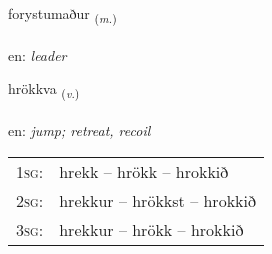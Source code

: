 \documentclass[frontgrid, backgrid]{flacards}\usepackage[]{graphicx}\usepackage[]{xcolor}
\begin{document}
\renewcommand{\flhead}{\vskip5pt \fboxsep=0pt {\small\bfseries\footnotesize Nafnorð | Noun}}
\renewcommand{\fcfoot}{\vskip5pt \fboxsep=0pt \hspace{2pt}{\small\bfseries\footnotesize 3K}}

\renewcommand{\blhead}{\vskip5pt {\small\bfseries\footnotesize Nafnorð | Noun }}
\renewcommand{\bcfoot}{\vskip5pt \hspace{2pt}{\small\bfseries\footnotesize 3K}}


{forystumaður \small{\textsubscript{(\textit{m.})}} \\[1ex] %
\textphonetic{[fɔːrɪstʏmaðʏr]} \\
en: \emph{leader} \\  [2ex]
\renewcommand*{\arraystretch}{0.8}
}

\renewcommand{\flhead}{\vskip5pt \fboxsep=0pt {\small\bfseries\footnotesize Sagnorð | Verb}}
\renewcommand{\fcfoot}{\vskip5pt \fboxsep=0pt \hspace{2pt}{\small\bfseries\footnotesize 3K}}

\renewcommand{\blhead}{\vskip5pt {\small\bfseries\footnotesize Sagnorð | Verb }}
\renewcommand{\bcfoot}{\vskip5pt \hspace{2pt}{\small\bfseries\footnotesize 3K}}


{hrökkva \small{\textsubscript{(\textit{v.})}} \\[1ex] %
\textphonetic{[r̥œhkva]} \\
en: \emph{jump; retreat, recoil} \\  [2ex]
\renewcommand*{\arraystretch}{0.8}
\begin{tabular}{p{1cm}l}
\textsc{1sg}: & hrekk -- hrökk -- hrokkið \\ 
\textsc{2sg}: & hrekkur -- hrökkst -- hrokkið \\ 
\textsc{3sg}: & hrekkur -- hrökk -- hrokkið \\ 
\end{tabular}
}
\end{document}
